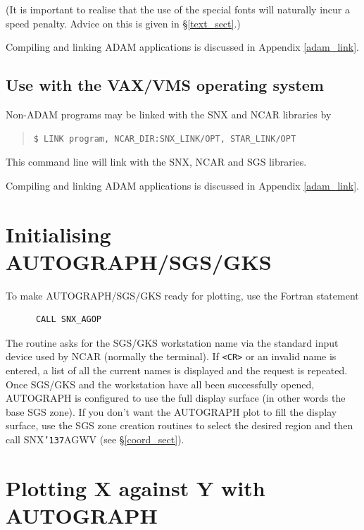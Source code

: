 \documentclass[11pt]{article}
\renewcommand{\_}{{\tt\char'137}}     %
\begin{document}
(It is important to realise that the use of the special fonts will naturally
incur a speed penalty.  Advice on this is given in \S\ref{text_sect}.)

Compiling and linking ADAM applications is discussed in Appendix
\ref{adam_link}.

\subsection {Use with the VAX/VMS operating system}

Non-ADAM programs may be linked with the SNX and NCAR libraries by

\begin{quote}
\begin{verbatim}
$ LINK program, NCAR_DIR:SNX_LINK/OPT, STAR_LINK/OPT
\end{verbatim}
\end{quote}

This command line will link with the SNX, NCAR and SGS libraries.

Compiling and linking ADAM applications is discussed in Appendix
\ref{adam_link}.

\section {Initialising AUTOGRAPH/SGS/GKS}

To make AUTOGRAPH/SGS/GKS ready for plotting, use the Fortran statement

\begin{verbatim}
      CALL SNX_AGOP
\end{verbatim}

The routine asks for the SGS/GKS workstation name via the standard input device
used by NCAR (normally the terminal).
If \verb+<CR>+ or an invalid name is entered, a list of all the current names
is displayed and the request is repeated.
Once SGS/GKS and the workstation have all been successfully opened,
AUTOGRAPH is configured to use the full display surface (in other words
the base SGS zone).
If you don't want the AUTOGRAPH plot to fill the display surface, use the SGS
zone creation routines to select the desired region and then call SNX\_AGWV
(see \S\ref{coord_sect}).


\section {Plotting X against Y with AUTOGRAPH}
\end{document}
